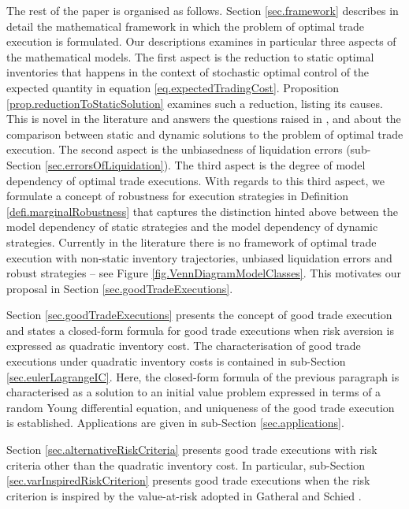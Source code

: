 \documentclass[10pt,a4paper]{article}
\begin{document}
\nocite{CJ19alg}
\nocite{HJN19mea}
\nocite{CDJ17alg}
\nocite{CJ19tra}


The rest of the paper is organised as follows. Section \ref{sec.framework} describes in detail the mathematical framework in which the problem of optimal trade execution is formulated. Our descriptions examines in particular three aspects of the mathematical models. The first aspect is the reduction to static optimal inventories that happens in the context of stochastic optimal control of the expected quantity in equation \eqref{eq.expectedTradingCost}.  Proposition \ref{prop.reductionToStaticSolution} examines such a reduction, listing its causes. This is novel in the literature and answers the questions raised in \cite{BD14opt}, \cite{BP18sta} and \cite{BBDN18sta}  about the comparison between static and dynamic solutions to the problem of optimal trade execution.  The second aspect is  the unbiasedness of liquidation errors (sub-Section \ref{sec.errorsOfLiquidation}). The third aspect is the degree of model dependency of optimal trade executions. With regards to this third aspect, we formulate a concept of robustness for execution strategies in Definition \ref{defi.marginalRobustness} that captures the distinction hinted above between the model dependency of static strategies and the model dependency of dynamic strategies.
Currently in the literature there is no framework of optimal trade execution with non-static inventory trajectories, unbiased liquidation errors and robust strategies -- see Figure \ref{fig.VennDiagramModelClasses}. This motivates our proposal in Section \ref{sec.goodTradeExecutions}.  

Section \ref{sec.goodTradeExecutions} presents the concept of good trade execution and states a closed-form formula for good trade executions when risk aversion is expressed as quadratic inventory cost. The characterisation of good trade executions under quadratic inventory costs is contained in sub-Section \ref{sec.eulerLagrangeIC}. Here, the closed-form formula of the previous  paragraph is characterised as a solution to an initial value problem expressed in terms of a   random Young differential equation, and uniqueness of the good trade execution  is established. Applications are given in sub-Section \ref{sec.applications}.

Section \ref{sec.alternativeRiskCriteria} presents good trade executions with risk criteria other than the quadratic inventory cost. In particular, sub-Section \ref{sec.varInspiredRiskCriterion} presents good trade executions when the risk criterion is inspired by the value-at-risk adopted in Gatheral and Schied \cite{GS11opt}.    
\end{document}
